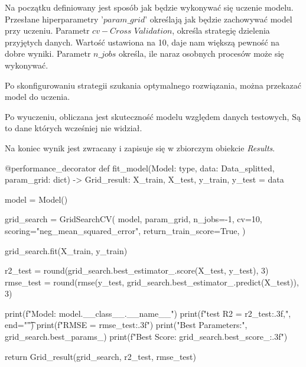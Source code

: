 \hspace{1.5cm} Na początku definiowany jest sposób jak będzie wykonywać się uczenie modelu. 
Przesłane hiperparametry '$param\_grid$' określają jak będzie zachowywać model przy uczeniu.
Parametr $cv  - \textit{Cross Validation}$, określa strategię dzielenia przyjętych danych.
Wartość ustawiona na 10, daje nam większą pewność na dobre wyniki.
Parametr $n\_jobs$ określa, ile naraz osobnych procesów może się wykonywać.

\hspace{1.5cm} Po skonfigurowaniu strategii szukania optymalnego rozwiązania, można przekazać model do uczenia.

\hspace{1.5cm} Po wyuczeniu, obliczana jest skuteczność modelu względem danych testowych, Są to dane których wcześniej nie widział. 

Na koniec wynik jest zwracany i zapisuje się w zbiorczym obiekcie \textit{Results}.

\begin{pythoncode}
@performance_decorator
def fit_model(Model: type, data: Data_splitted, param_grid: dict) -> Grid_result:
    X_train, X_test, y_train, y_test = data

    model = Model()

    grid_search = GridSearchCV(
        model,
        param_grid,
        n_jobs=-1,
        cv=10,
        scoring="neg_mean_squared_error",
        return_train_score=True,
    )

    grid_search.fit(X_train, y_train)

    r2_test = round(grid_search.best_estimator_.score(X_test, y_test), 3)
    rmse_test = round(rmse(y_test, grid_search.best_estimator_.predict(X_test)), 3)

    print(f"Model: {model.__class__.__name__}")
    print(f"test R2 = {r2_test:.3f},", end="\t")
    print(f"RMSE = {rmse_test:.3f}")
    print("Best Parameters:", grid_search.best_params_)
    print(f"Best Score: {grid_search.best_score_:.3f}")

    return Grid_result(grid_search, r2_test, rmse_test)
\end{pythoncode}
